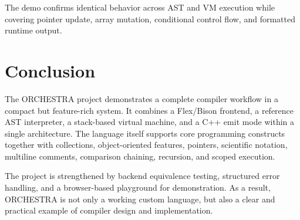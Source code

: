 \documentclass[12pt,a4paper]{article}
\begin{document}
The demo confirms identical behavior across AST and VM execution while covering pointer update, array mutation, conditional control flow, and formatted runtime output.

\section{Conclusion}

The ORCHESTRA project demonstrates a complete compiler workflow in a compact but feature-rich system. It combines a Flex/Bison frontend, a reference AST interpreter, a stack-based virtual machine, and a C++ emit mode within a single architecture. The language itself supports core programming constructs together with collections, object-oriented features, pointers, scientific notation, multiline comments, comparison chaining, recursion, and scoped execution.

The project is strengthened by backend equivalence testing, structured error handling, and a browser-based playground for demonstration. As a result, ORCHESTRA is not only a working custom language, but also a clear and practical example of compiler design and implementation.
\end{document}
